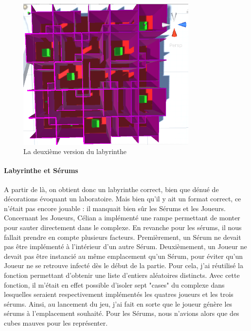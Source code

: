 \documentclass{article}
\begin{document}
\begin{figure}[H]
    \centering
    \includegraphics[width=0.8\textwidth]{Salles.png}
    \caption{La deuxième version du labyrinthe}
    \label{La deuxième version du labyrinthe}
\end{figure}

\paragraph{Labyrinthe et Sérums}
A partir de là, on obtient donc un labyrinthe correct, bien que dénué de décorations évoquant un laboratoire. Mais bien qu'il y ait un format correct, ce n'était pas encore jouable : il manquait bien sûr les Sérums et les Joueurs. Concernant les Joueurs, Célian a implémenté une rampe permettant de monter pour sauter directement dans le complexe. En revanche pour les sérums, il nous fallait prendre en compte plusieurs facteurs. Premièrement, un Sérum ne devait pas être implémenté à l'intérieur d'un autre Sérum. Deuxièmement, un Joueur ne devait pas être instancié au même emplacement qu'un Sérum, pour éviter qu'un Joueur ne se retrouve infecté dès le début de la partie. Pour cela, j'ai réutilisé la fonction permettant d'obtenir une liste d'entiers aléatoires distincts. Avec cette fonction, il m'était en effet possible d'isoler sept "cases" du complexe dans lesquelles seraient respectivement implémentés les quatres joueurs et les trois sérums. Ainsi, au lancement du jeu, j'ai fait en sorte que le joueur génère les sérums à l'emplacement souhaité. Pour les Sérums, nous n'avions alors que des cubes mauves pour les représenter. 
\end{document}
